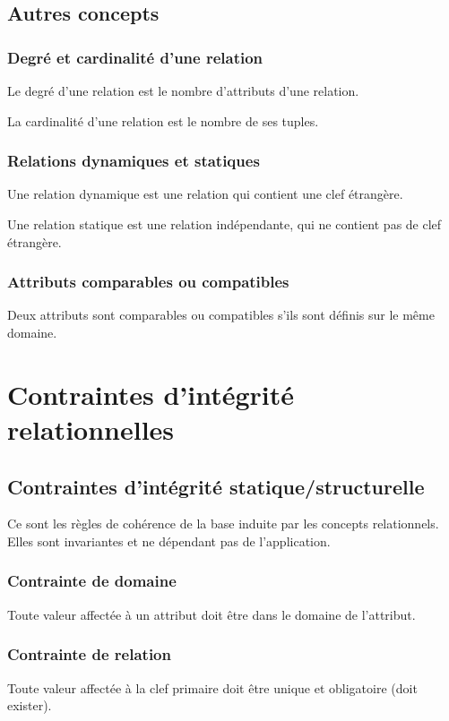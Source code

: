 \documentclass[10pt]{article}
\begin{document}
        \subsection{Autres concepts}
            \subsubsection*{Degré et cardinalité d'une relation}
                Le degré d'une relation est le nombre d'attributs d'une relation.

                La cardinalité d'une relation est le nombre de ses tuples.

            \subsubsection*{Relations dynamiques et statiques}
                Une relation dynamique est une relation qui contient une clef étrangère.

                Une relation statique est une relation indépendante, qui ne contient pas de clef étrangère.

            \subsubsection*{Attributs comparables ou compatibles}
                Deux attributs sont comparables ou compatibles s'ils sont définis sur le même domaine.

    \section{Contraintes d'intégrité relationnelles}
        \subsection{Contraintes d'intégrité statique/structurelle}
            Ce sont les règles de cohérence de la base induite par les concepts relationnels. Elles sont invariantes et ne dépendant pas de l'application.

            \subsubsection*{Contrainte de domaine}
                Toute valeur affectée à un attribut doit être dans le domaine de l'attribut.

            \subsubsection*{Contrainte de relation}
                Toute valeur affectée à la clef primaire doit être unique et obligatoire (doit exister).
\end{document}
